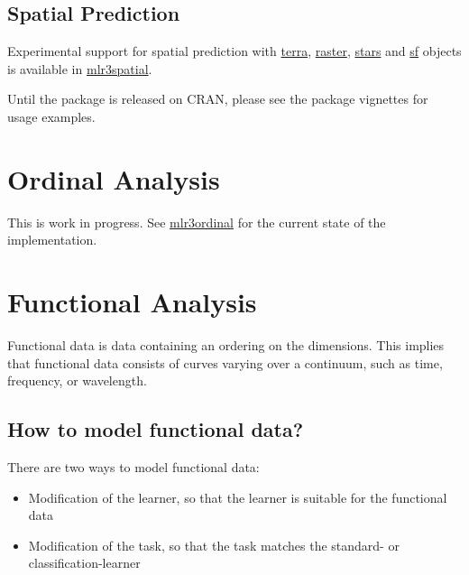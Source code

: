 \documentclass[
]{scrbook}
\providecommand{\tightlist}{%
  \setlength{\itemsep}{0pt}\setlength{\parskip}{0pt}}
\begin{document}
\hypertarget{spatial-prediction}{%
\subsection{Spatial Prediction}\label{spatial-prediction}}

Experimental support for spatial prediction with \href{https://cran.r-project.org/package=terra}{terra}, \href{https://cran.r-project.org/package=raster}{raster}, \href{https://cran.r-project.org/package=stars}{stars} and \href{https://cran.r-project.org/package=sf}{sf} objects is available in \href{https://github.com/mlr-org/mlr3spatial}{mlr3spatial}.

Until the package is released on CRAN, please see the package vignettes for usage examples.

\hypertarget{ordinal}{%
\section{Ordinal Analysis}\label{ordinal}}

This is work in progress.
See \href{https://github.com/mlr-org/mlr3ordinal}{mlr3ordinal} for the current state of the implementation.

\hypertarget{functional}{%
\section{Functional Analysis}\label{functional}}

Functional data is data containing an ordering on the dimensions.
This implies that functional data consists of curves varying over a continuum, such as time, frequency, or wavelength.

\hypertarget{how-to-model-functional-data}{%
\subsection{How to model functional data?}\label{how-to-model-functional-data}}

There are two ways to model functional data:

\begin{itemize}
\tightlist
\item
  Modification of the learner, so that the learner is suitable for the functional data
\item
  Modification of the task, so that the task matches the standard- or classification-learner
\end{itemize}
\end{document}
